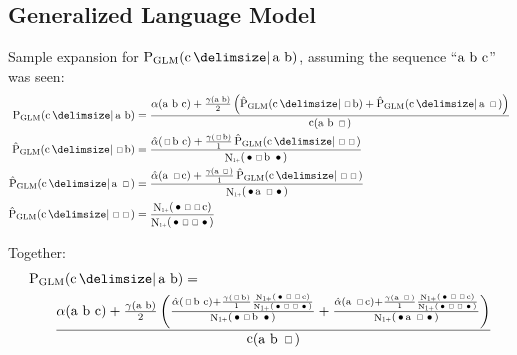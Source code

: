 \documentclass[11pt,a4paper]{report}
\newcommand*{\Scale}[2][4]{\scalebox{#1}{$#2$}}%
\DeclareMathOperator{\Count}{c}
\DeclareMathOperator{\ContCount}{N}
\newcommand{\ContCountIp}  {\ContCount_{\Scale[0.5]{1+}}}
\newcommand{\Skp}{\ensuremath{\,\Scale[0.7]{\square}\,}}
\newcommand{\WSkp}{\ensuremath{\,\bullet\,}}
\begin{document}
{\begin{appendices}
\clearpage
\section{Generalized Language Model}

\newcommand{\ProbGLMcab}[2]
  {\frac{\alpha(\text{a b c}) + \frac{\gamma(\text{a b})}{2}\left(#1 + #2\right)}{\Count(\text{a b \Skp})}}
\newcommand{\ProbGLMcsb}[1]
  {\frac{\hat\alpha(\text{\Skp b c}) + \frac{\gamma(\text{\Skp b})}{1} #1}{\ContCountIp(\text{\WSkp \Skp b \WSkp})}}
\newcommand{\ProbGLMcas}[1]
  {\frac{\hat\alpha(\text{a \Skp c}) + \frac{\gamma(\text{a \Skp})}{1} #1}{\ContCountIp(\text{\WSkp a \Skp \WSkp})}}
\newcommand{\ProbGLMcss}
  {\frac{\ContCountIp(\text{\WSkp \Skp \Skp c})}{\ContCountIp(\text{\WSkp \Skp \Skp \WSkp})}}

Sample expansion for $\ProbGLM{\text{c}}{\text{a b}}$, assuming the sequence
``$\text{\text{a b c}}$'' was seen:
\begin{align}
  \ProbGLM {\text{c}}{\text{a b}}       &= \ProbGLMcab{\ProbGLM*{\text{c}}{\text{\Skp b}}}{\ProbGLM*{\text{c}}{\text{a \Skp}}} \\
  \ProbGLM*{\text{c}}{\text{\Skp b}}    &= \ProbGLMcsb{\ProbGLM*{\text{c}}{\text{\Skp \Skp}}} \\
  \ProbGLM*{\text{c}}{\text{a \Skp}}    &= \ProbGLMcas{\ProbGLM*{\text{c}}{\text{\Skp \Skp}}} \\
  \ProbGLM*{\text{c}}{\text{\Skp \Skp}} &= \ProbGLMcss
\end{align}

Together:
\begin{align}
  &\ProbGLM{\text{c}}{\text{a b}} =\\
  &\qquad \ProbGLMcab{\ProbGLMcsb{\ProbGLMcss}}
                                 {\ProbGLMcas{\ProbGLMcss}} \nonumber
\end{align}


\end{appendices}}
\end{document}
